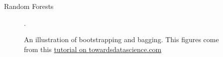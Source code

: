 \documentclass[12pt]{pom_thesis}
\begin{document}
\begin{chapter}{Random Forests}
\begin{figure}[h]
\centering
{}
\label{cohabitants-example-1}
\caption{An illustration of bootstrapping and bagging. This figures come from this \href{https://towardsdatascience.com/decision-trees-and-random-forests-for-classification-and-regression-pt-2-2b1fcd03e342}{tutorial on towardsdatascience.com}}. 
\end{figure}


\end{chapter}
\end{document}
